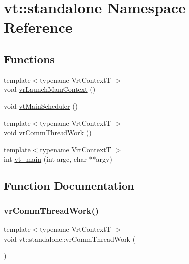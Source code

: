 \hypertarget{namespacevt_1_1standalone}{}\section{vt\+:\+:standalone Namespace Reference}
\label{namespacevt_1_1standalone}
\subsection*{Functions}
\begin{DoxyCompactItemize}
\item 
{\footnotesize template$<$typename Vrt\+ContextT $>$ }\\void \hyperlink{namespacevt_1_1standalone_a670dc96651da265f465fbe0536555430}{vr\+Launch\+Main\+Context} ()
\item 
void \hyperlink{namespacevt_1_1standalone_a381ccc8b6c5dde4e852b5b012c525ba1}{vt\+Main\+Scheduler} ()
\item 
{\footnotesize template$<$typename Vrt\+ContextT $>$ }\\void \hyperlink{namespacevt_1_1standalone_af76367e5e8324e34b2bc335f54178c19}{vr\+Comm\+Thread\+Work} ()
\item 
{\footnotesize template$<$typename Vrt\+ContextT $>$ }\\int \hyperlink{namespacevt_1_1standalone_acf67352326663d62bdb6c6169d88a783}{vt\+\_\+main} (int argc, char $\ast$$\ast$argv)
\end{DoxyCompactItemize}


\subsection{Function Documentation}
\mbox{\label{namespacevt_1_1standalone_af76367e5e8324e34b2bc335f54178c19}} 
\subsubsection{\texorpdfstring{vr\+Comm\+Thread\+Work()}{vrCommThreadWork()}}
{\footnotesize\ttfamily template$<$typename Vrt\+ContextT $>$ \\
void vt\+::standalone\+::vr\+Comm\+Thread\+Work (\begin{DoxyParamCaption}{ }\end{DoxyParamCaption})\hspace{0.3cm}{\ttfamily [inline]}}

